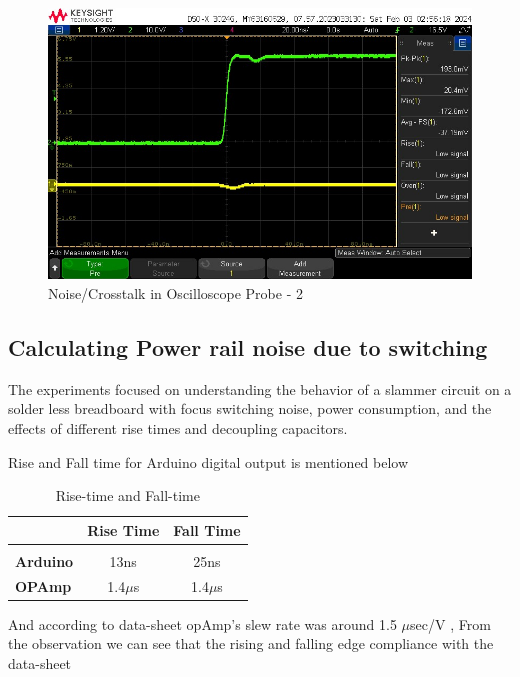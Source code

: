 \documentclass[a4paper,11pt]{article}%
\begin{document}
	\begin{figure}[!h]
		\centering
		\includegraphics[scale=0.6]{figures/noise_crosstalk2.jpeg}
		\caption{Noise/Crosstalk in Oscilloscope Probe - 2}
	\end{figure}

	\subsection{Calculating Power rail noise due to switching}



		The experiments focused on understanding the behavior of a slammer circuit on a solder less breadboard with focus switching noise, power consumption, and the effects of different rise times and decoupling capacitors.

	
		Rise and Fall time for Arduino digital output is mentioned below
		
		\begin{table}[H]
			\centering
		
			\begin{tabular}{l c c}
		
				&\textbf{Rise Time}&\textbf{Fall Time}\\\hline
				&&\\
				\textbf{Arduino}&13ns&25ns\\
				\textbf{OPAmp}&1.4$\mu$s&1.4$\mu$s\\
		
			\end{tabular}
			\caption{Rise-time and Fall-time}
			\label{tab_rise_fall}
		\end{table}
			
		And according to data-sheet opAmp's slew rate was around 1.5 $\mu$sec/V , From the observation we can see that the rising and falling edge compliance with the data-sheet
\end{document}
